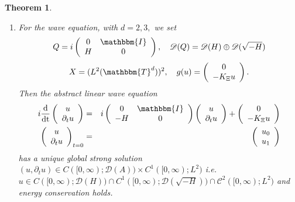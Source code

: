 \documentclass[11pt, oneside]{article}   	%
\newcommand{\mathd}{\mathrm{d}}
\newcommand{\tmop}[1]{\ensuremath{\operatorname{#1}}}
\newenvironment{enumeratenumeric}{\begin{enumerate}[1.] }{\end{enumerate}}
\newtheorem{theorem}{Theorem}[section]
\newcommand{\CC}{\mathscr{C}}
\begin{document}
\begin{theorem}
\begin{enumeratenumeric}
				\item For the wave equation, with $d=2,3,$ we set 
				\[ Q = i \left(\begin{array}{cc}
				0 & \mathbbm{I}\\
				{H} & 0
				\end{array}\right), \quad \mathscr{D} (Q) =\mathscr{D} ({H}) \oplus
				\mathscr{D} ( \sqrt{- {H}} )\] \[X = (L^2
				(\mathbbm{T}^d))^2,\quad  g (u) = \left(\begin{array}{c}
				0\\
				- K_{\Xi} u
				\end{array}\right) . \]
				Then the abstract linear wave equation
				\begin{eqnarray*}
					i \frac{\mathd}{\tmop{dt}} \left(\begin{array}{c}
						u\\
						\partial_t u
					\end{array}\right) & = & i \left(\begin{array}{cc}
					0 & \mathbbm{I}\\
					- {H} & 0
				\end{array}\right) \left(\begin{array}{c}
				u\\
				\partial_t u
			\end{array}\right) + \left(\begin{array}{c}
			0\\
			- K_{\Xi} u
		\end{array}\right)\\
		\left(\begin{array}{c}
			u\\
			\partial_t u
		\end{array}\right)_{t = 0} & = & \left(\begin{array}{c}
		u_0\\
		u_1
	\end{array}\right)
\end{eqnarray*}
has a unique global strong solution $(u, \partial_t u) \in C ([0, \infty)
; \mathscr{D} (A)) \times C^1 ([0, \infty) ; L^2)$ i.e. $u \in C ([0, \infty)
; \mathscr{D} (H)) \cap C^1 ( [0, \infty) ; \mathscr{D} (
\sqrt{- {H}} ) ) \cap \CC^2 ([0, \infty) ; L^2)$ and
energy conservation holds. 
\end{enumeratenumeric}
\end{theorem}
\end{document}
